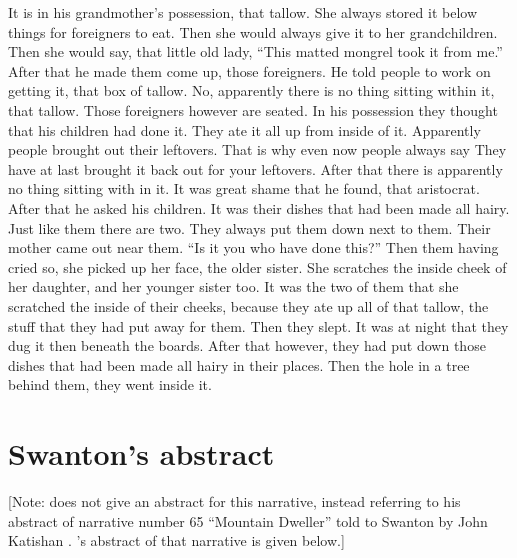 \begin{pairs}
\begin{Rightside}
It is in his grandmother’s possession, that tallow.
She always stored it below things for foreigners to eat.
Then she would always give it to her grandchildren.
Then she would say, that little old lady,
\qqk{}“This matted mongrel took it from me.”
\pend
\pstart
{}After that he made them come up, those foreigners.
He told people to work on getting it, that box of tallow.
No, apparently there is no thing sitting within it, that tallow.
Those foreigners however are seated.
In his possession they thought that his children had done it.
They ate it all up from inside of it.
Apparently people brought out their leftovers.
That is why even now people always say
They have at last brought it back out for your leftovers.
After that there is apparently no thing sitting with in it.
It was great shame that he found, that aristocrat.
After that he asked his children.
It was their dishes that had been made all hairy.
Just like them there are two.
They always put them down next to them.
Their mother came out near them.
\qqk{}“Is it you who have done this?”
Then them having cried so, she picked up her face, the older sister.
She scratches the inside cheek of her daughter, and her younger sister too.
It was the two of them that she scratched the inside of their cheeks, because they ate up all of that tallow, the stuff that they had put away for them.
Then they slept.
It was at night that they dug it then beneath the boards.
After that however, they had put down those dishes that had been made all hairy in their places.
Then the hole in a tree behind them, they went inside it.
\pend
\endnumbering
\end{Rightside}
\end{pairs}
\Columns


\section{Swanton’s abstract}\label{sec:92-swanton-abstract}

{}[Note: \citeauthor{swanton:1909} does not give an abstract for this narrative, instead referring to his abstract of narrative number 65 “Mountain Dweller” told to Swanton by  John Katishan \parencite[222–224]{swanton:1909}.
\citeauthor{swanton:1909}’s abstract of that narrative \parencite[441]{swanton:1909} is given below.]

